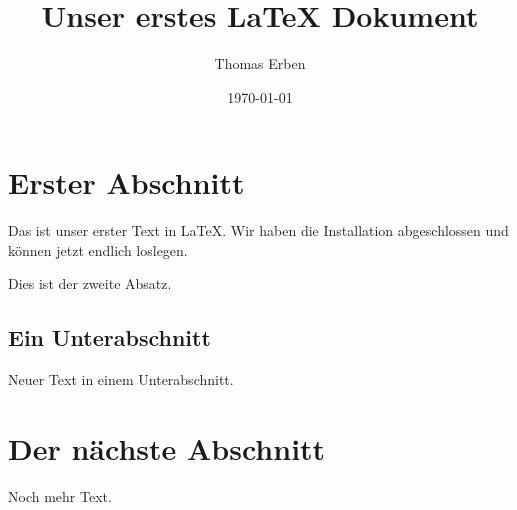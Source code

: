 \documentclass[a4paper,12pt]{scrartcl}
\title{Unser erstes \LaTeX{} Dokument}
\author{Thomas Erben}
\date{\today}
\begin{document}
%
%
\maketitle
\tableofcontents
%

%
\section{Erster Abschnitt}
Das ist unser erster Text in \LaTeX{}. Wir haben die Installation abgeschlossen
und können jetzt endlich loslegen.

Dies ist der zweite Absatz.
%
\subsection{Ein Unterabschnitt}
Neuer Text in einem Unterabschnitt.
%
\section{Der nächste Abschnitt}
Noch mehr Text.
\end{document}

